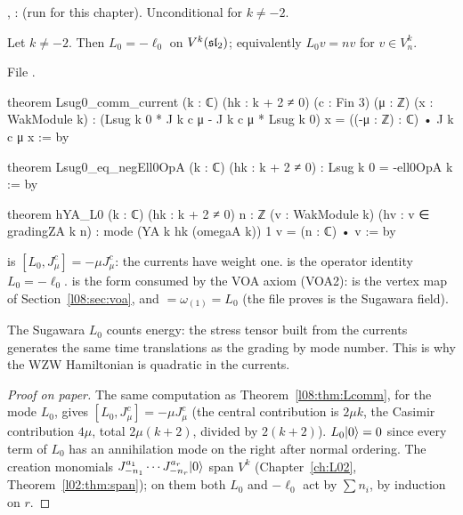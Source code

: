 \begin{status}
\allowbreak{}\allowbreak{}\allowbreak{}\allowbreak{}, \allowbreak{}\allowbreak{}\allowbreak{}\allowbreak{}:
\lean{[propext, Classical.}\allowbreak{}\allowbreak\lean{sound]} (run for this chapter). Unconditional for $k\ne-2$.
\end{status}

\begin{theorem}\label{l08:thm:L0}
Let $k\ne-2$. Then $L_0 = -\ell_0$ on $V^k(\mathfrak{sl}_2)$; equivalently $L_0v = nv$ for $v\in V^k_n$.
\end{theorem}

\noindent File .
\begin{leancode}
theorem Lsug0_comm_current (k : ℂ) (hk : k + 2 ≠ 0) (c : Fin 3) (μ : ℤ) (x : WakModule k) :
    (Lsug k 0 * J k c μ - J k c μ * Lsug k 0) x = ((-μ : ℤ) : ℂ) • J k c μ x := by

theorem Lsug0_eq_negEll0OpA (k : ℂ) (hk : k + 2 ≠ 0) : Lsug k 0 = -ell0OpA k := by

theorem hYA_L0 (k : ℂ) (hk : k + 2 ≠ 0) {n : ℤ} (v : WakModule k) (hv : v ∈ gradingZA k n) :
    mode (YA k hk (omegaA k)) 1 v = (n : ℂ) • v := by
\end{leancode}

\begin{dictionary}
 is $[L_0,J^c_\mu] = -\mu J^c_\mu$: the currents have weight one.
 is the operator identity $L_0 = -\ell_0$.  is the form
consumed by the VOA axiom (VOA2):  is the vertex map of Section~\ref{l08:sec:voa}, and
 $= \omega_{(1)} = L_0$ (the file proves  is
the Sugawara field).
\end{dictionary}

\begin{physics}
The Sugawara $L_0$ counts energy: the stress tensor built from the currents generates the same time
translations as the grading by mode number. This is why the WZW Hamiltonian is quadratic in the
currents.
\end{physics}

\begin{proof}[Proof on paper]
The same computation as Theorem~\ref{l08:thm:Lcomm}, for the mode $L_0$, gives
$[L_0,J^c_\mu] = -\mu J^c_\mu$ (the central contribution is $2\mu k$, the Casimir contribution $4\mu$,
total $2\mu(k+2)$, divided by $2(k+2)$). $L_0|0\rangle = 0$ since every term of $L_0$ has an
annihilation mode on the right after normal ordering. The creation monomials
$J^{a_1}_{-n_1}\cdots J^{a_r}_{-n_r}|0\rangle$ span $V^k$ (Chapter~\ref{ch:L02},
Theorem~\ref{l02:thm:span}); on them both $L_0$ and $-\ell_0$ act by $\sum n_i$, by induction on $r$.
\end{proof}

